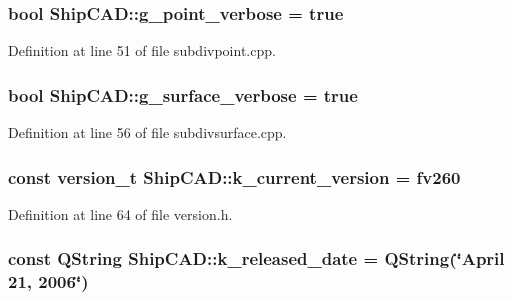 \hypertarget{namespaceShipCAD_ae059a88fbc18c56ceee2fd1cd7f2aad0}{
\subsubsection[{g\-\_\-point\-\_\-verbose}]{\setlength{\rightskip}{0pt plus 5cm}bool Ship\-C\-A\-D\-::g\-\_\-point\-\_\-verbose = true}}\label{namespaceShipCAD_ae059a88fbc18c56ceee2fd1cd7f2aad0}


Definition at line 51 of file subdivpoint.\-cpp.

\hypertarget{namespaceShipCAD_a45538d3cd2c9293bf0bd4b09a23670ac}{
\subsubsection[{g\-\_\-surface\-\_\-verbose}]{\setlength{\rightskip}{0pt plus 5cm}bool Ship\-C\-A\-D\-::g\-\_\-surface\-\_\-verbose = true}}\label{namespaceShipCAD_a45538d3cd2c9293bf0bd4b09a23670ac}


Definition at line 56 of file subdivsurface.\-cpp.

\hypertarget{namespaceShipCAD_aa3415e1acf9bdb19e24f31f5138d6a60}{
\subsubsection[{k\-\_\-current\-\_\-version}]{\setlength{\rightskip}{0pt plus 5cm}const {\bf version\-\_\-t} Ship\-C\-A\-D\-::k\-\_\-current\-\_\-version = {\bf fv260}}}\label{namespaceShipCAD_aa3415e1acf9bdb19e24f31f5138d6a60}


Definition at line 64 of file version.\-h.

\hypertarget{namespaceShipCAD_a833fc6d39d2f0fd7fa31d0a691b0b726}{
\subsubsection[{k\-\_\-released\-\_\-date}]{\setlength{\rightskip}{0pt plus 5cm}const Q\-String Ship\-C\-A\-D\-::k\-\_\-released\-\_\-date = Q\-String(\char`\"{}April 21, 2006\char`\"{})}}\label{namespaceShipCAD_a833fc6d39d2f0fd7fa31d0a691b0b726}


